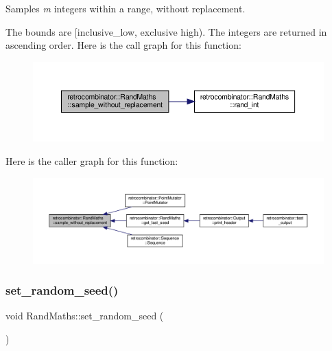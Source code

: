 Samples {\itshape m} integers within a range, without replacement. 

The bounds are \mbox{[}inclusive\+\_\+low, exclusive high). The integers are returned in ascending order. Here is the call graph for this function\+:
\nopagebreak
\begin{figure}[H]
\begin{center}
\leavevmode
\includegraphics[width=350pt]{classretrocombinator_1_1RandMaths_a6a7fe159f46afec51d997e4d07d2cfe6_cgraph}
\end{center}
\end{figure}
Here is the caller graph for this function\+:
\nopagebreak
\begin{figure}[H]
\begin{center}
\leavevmode
\includegraphics[width=350pt]{classretrocombinator_1_1RandMaths_a6a7fe159f46afec51d997e4d07d2cfe6_icgraph}
\end{center}
\end{figure}
\mbox{\label{classretrocombinator_1_1RandMaths_a2b61e31de6067ffa35531d5bde40f4c6}} 
\subsubsection{\texorpdfstring{set\+\_\+random\+\_\+seed()}{set\_random\_seed()}}
{\footnotesize\ttfamily void Rand\+Maths\+::set\+\_\+random\+\_\+seed (\begin{DoxyParamCaption}{ }\end{DoxyParamCaption})}



